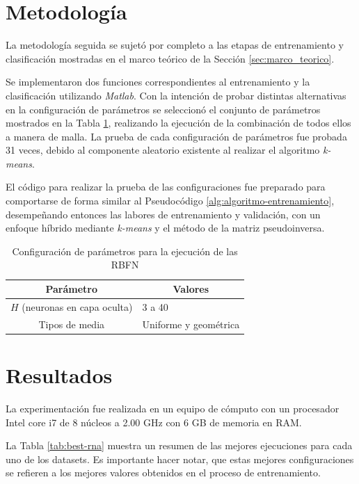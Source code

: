 \documentclass[journal]{IEEEtran}
\begin{document}
\section{Metodología}
\label{sec:metodologia}
La metodología seguida se sujetó por completo a las etapas de entrenamiento y clasificación mostradas en el marco teórico de la Sección \ref{sec:marco_teorico}.

Se implementaron dos funciones correspondientes al entrenamiento y la clasificación utilizando \emph{Matlab}.
Con la intención de probar distintas alternativas en la configuración de parámetros se  seleccionó el conjunto de parámetros mostrados en la Tabla \ref{tbl:parametros}, realizando la ejecución de la combinación de todos ellos a manera de malla.
La prueba de cada configuración de parámetros fue probada 31 veces, debido al componente aleatorio existente al realizar el algoritmo \emph{k-means}.

El código para realizar la prueba de las configuraciones fue preparado para comportarse de forma similar al Pseudocódigo \ref{alg:algoritmo-entrenamiento}, desempeñando entonces las labores de entrenamiento y validación, con un enfoque híbrido mediante \emph{k-means} y el método de la matriz pseudoinversa.

\begin{table}[h]
\centering
\begin{tabular}{@{}cl@{}}
\toprule
\textbf{Parámetro} & \multicolumn{1}{c}{\textbf{Valores}} \\ \midrule
$H$ (neuronas en capa oculta)                  & 3 a 40                         \\
Tipos de media                & Uniforme y geométrica\\
\bottomrule
\end{tabular}
\caption{Configuración de parámetros para la ejecución de las RBFN}
\label{tbl:parametros}
\end{table}


\section{Resultados} 
\label{sec:resultados}
La experimentación fue realizada en un equipo de cómputo con un procesador Intel core i7 de 8 núcleos a 2.00 GHz con 6 GB de memoria en RAM.

La Tabla \ref{tab:best-rna} muestra un resumen de las mejores ejecuciones para cada uno de los datasets.
Es importante hacer notar, que estas mejores configuraciones se refieren a los mejores valores obtenidos en el proceso de entrenamiento.
\end{document}
